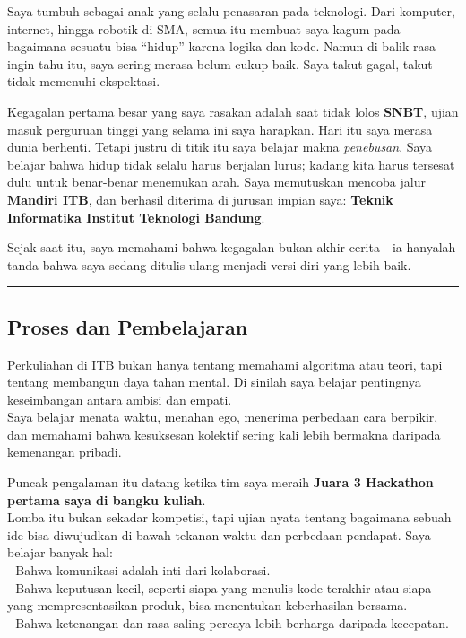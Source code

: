 \documentclass[
  letterpaper,
  DIV=11,
  numbers=noendperiod]{scrreprt}
\begin{document}
Saya tumbuh sebagai anak yang selalu penasaran pada teknologi. Dari
komputer, internet, hingga robotik di SMA, semua itu membuat saya kagum
pada bagaimana sesuatu bisa ``hidup'' karena logika dan kode. Namun di
balik rasa ingin tahu itu, saya sering merasa belum cukup baik. Saya
takut gagal, takut tidak memenuhi ekspektasi.

Kegagalan pertama besar yang saya rasakan adalah saat tidak lolos
\textbf{SNBT}, ujian masuk perguruan tinggi yang selama ini saya
harapkan. Hari itu saya merasa dunia berhenti. Tetapi justru di titik
itu saya belajar makna \emph{penebusan}. Saya belajar bahwa hidup tidak
selalu harus berjalan lurus; kadang kita harus tersesat dulu untuk
benar-benar menemukan arah. Saya memutuskan mencoba jalur
\textbf{Mandiri ITB}, dan berhasil diterima di jurusan impian saya:
\textbf{Teknik Informatika Institut Teknologi Bandung}.

Sejak saat itu, saya memahami bahwa kegagalan bukan akhir cerita---ia
hanyalah tanda bahwa saya sedang ditulis ulang menjadi versi diri yang
lebih baik.

\begin{center}\rule{0.5\linewidth}{0.5pt}\end{center}

\subsection{\texorpdfstring{\textbf{Proses dan
Pembelajaran}}{Proses dan Pembelajaran}}\label{proses-dan-pembelajaran}

Perkuliahan di ITB bukan hanya tentang memahami algoritma atau teori,
tapi tentang membangun daya tahan mental. Di sinilah saya belajar
pentingnya keseimbangan antara ambisi dan empati.\\
Saya belajar menata waktu, menahan ego, menerima perbedaan cara
berpikir, dan memahami bahwa kesuksesan kolektif sering kali lebih
bermakna daripada kemenangan pribadi.

Puncak pengalaman itu datang ketika tim saya meraih \textbf{Juara 3
Hackathon pertama saya di bangku kuliah}.\\
Lomba itu bukan sekadar kompetisi, tapi ujian nyata tentang bagaimana
sebuah ide bisa diwujudkan di bawah tekanan waktu dan perbedaan
pendapat. Saya belajar banyak hal:\\
- Bahwa komunikasi adalah inti dari kolaborasi.\\
- Bahwa keputusan kecil, seperti siapa yang menulis kode terakhir atau
siapa yang mempresentasikan produk, bisa menentukan keberhasilan
bersama.\\
- Bahwa ketenangan dan rasa saling percaya lebih berharga daripada
kecepatan.
\end{document}
